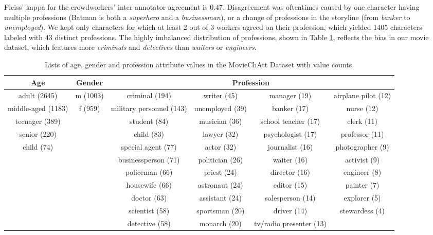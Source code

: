 Fleiss' kappa for the crowdworkers' inter-annotator agreement is $0.47$.
Disagreement was oftentimes caused by one character having multiple professions (Batman is both a \textit{superhero} and a \textit{businessman}), or a change of professions in the storyline (from \textit{banker} to \textit{unemployed}).
We kept only characters for which at least 2 out of 3 workers agreed on their profession,
which yielded 1405 characters labeled with 43 distinct professions.
The highly imbalanced distribution of professions, shown in Table \ref{moviechatt}, reflects the bias in our movie dataset, which features more \textit{criminals} and \textit{detectives} than \textit{waiters} or \textit{engineers}.

\begin{table}[h!]
\centering
\begin{adjustbox}{width=0.95\textwidth}
\begin{tabular}{cccccc}
\textbf{Age}       & \textbf{Gender}          & \multicolumn{4}{c}{\textbf{Profession}}  \\ \toprule
adult (2645)       & m (1003) & criminal (194)           & writer (45)     & manager (19)            & airplane pilot (12) \\
middle-aged (1183) & f (959)  & military personnel (143) & unemployed (39) & banker (17)             & nurse (12)          \\
teenager (389)     &          & student (84)             & musician (36)   & school teacher (17)     & clerk (11)          \\
senior (220)       &          & child (83)               & lawyer (32)     & psychologist (17)       & professor (11)      \\
child (74)         &          & special agent (77)       & actor (32)      & journalist (16)         & photographer (9)    \\
                   &          & businessperson (71)      & politician (26) & waiter (16)             & activist (9)        \\
                   &          & policeman (66)           & priest (24)     & director (16)           & engineer (8)        \\
                   &          & housewife (66)           & astronaut (24)  & editor (15)             & painter (7)         \\
                   &          & doctor (63)              & assistant (24)  & salesperson (14)        & explorer (5)        \\
                   &          & scientist (58)           & sportsman (20)  & driver (14)             & stewardess (4)      \\
                   &          & detective (58)           & monarch (20)    & tv/radio presenter (13) &  
\end{tabular}
\end{adjustbox}
\caption{Lists of age, gender and profession attribute values in the MovieChAtt Dataset with value counts.}
\label{moviechatt}
\end{table}

